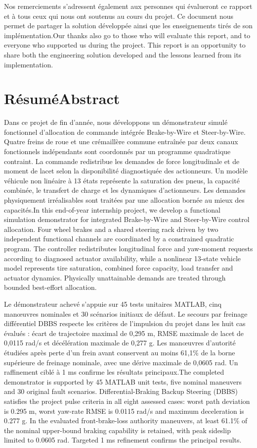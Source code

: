 \documentclass[11pt,a4paper,oneside]{report}
\newcommand{\bi}[2]{\iffrench #2\else #1\fi}
\newcommand{\front}[2]{\chapter*{\bi{#1}{#2}}\addcontentsline{toc}{chapter}{\bi{#1}{#2}}\markboth{\bi{#1}{#2}}{}}
\begin{document}
\bi{Our thanks also go to those who will evaluate this report, and to everyone who supported us during the project. This report is an opportunity to share both the engineering solution developed and the lessons learned from its implementation.}{Nos remerciements s'adressent également aux personnes qui évalueront ce rapport et à tous ceux qui nous ont soutenus au cours du projet. Ce document nous permet de partager la solution développée ainsi que les enseignements tirés de son implémentation.}
\front{Abstract}{Résumé}
\bi{In this end-of-year internship project, we develop a functional simulation demonstrator for integrated Brake-by-Wire and Steer-by-Wire control allocation. Four wheel brakes and a shared steering rack driven by two independent functional channels are coordinated by a constrained quadratic program. The controller redistributes longitudinal force and yaw-moment requests according to diagnosed actuator availability, while a nonlinear 13-state vehicle model represents tire saturation, combined force capacity, load transfer and actuator dynamics. Physically unattainable demands are treated through bounded best-effort allocation.}{Dans ce projet de fin d'année, nous développons un démonstrateur simulé fonctionnel d'allocation de commande intégrée Brake-by-Wire et Steer-by-Wire. Quatre freins de roue et une crémaillère commune entraînée par deux canaux fonctionnels indépendants sont coordonnés par un programme quadratique contraint. La commande redistribue les demandes de force longitudinale et de moment de lacet selon la disponibilité diagnostiquée des actionneurs. Un modèle véhicule non linéaire à 13 états représente la saturation des pneus, la capacité combinée, le transfert de charge et les dynamiques d'actionneurs. Les demandes physiquement irréalisables sont traitées par une allocation bornée au mieux des capacités.}

\bi{The completed demonstrator is supported by 45 MATLAB unit tests, five nominal maneuvers and 30 original fault scenarios. Differential-Braking Backup Steering (DBBS) satisfies the project pulse criteria in all eight assessed cases: worst path deviation is 0.295 m, worst yaw-rate RMSE is 0.0115 rad/s and maximum deceleration is 0.277 g. In the evaluated front-brake-loss authority maneuvers, at least 61.1\% of the nominal upper-bound braking capability is retained, with peak sideslip limited to 0.0605 rad. Targeted 1 ms refinement confirms the principal results.}{Le démonstrateur achevé s'appuie sur 45 tests unitaires MATLAB, cinq man\oe{}uvres nominales et 30 scénarios initiaux de défaut. Le secours par freinage différentiel DBBS respecte les critères de l'impulsion du projet dans les huit cas évalués : écart de trajectoire maximal de 0,295 m, RMSE maximale de lacet de 0,0115 rad/s et décélération maximale de 0,277 g. Les man\oe{}uvres d'autorité étudiées après perte d'un frein avant conservent au moins 61,1\% de la borne supérieure de freinage nominale, avec une dérive maximale de 0,0605 rad. Un raffinement ciblé à 1 ms confirme les résultats principaux.}
\end{document}
